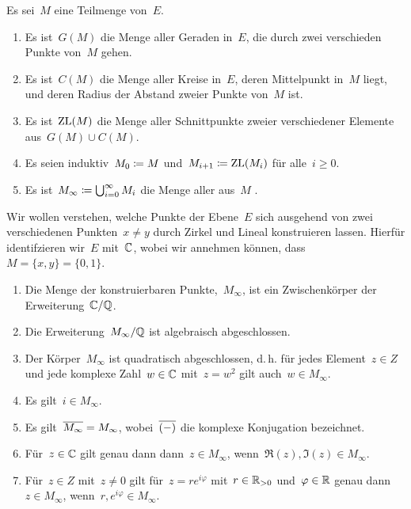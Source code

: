 \begin{definition}
  Es sei~$M$ eine Teilmenge von~$E$.
  \begin{enumerate}
    \item
      Es ist~$G(M)$ die Menge aller Geraden in~$E$, die durch zwei verschieden Punkte von~$M$ gehen.
    \item
      Es ist~$C(M)$ die Menge aller Kreise in~$E$, deren Mittelpunkt in~$M$ liegt, und deren Radius der Abstand zweier Punkte von~$M$ ist.
    \item
      Es ist~$\operatorname{ZL}(M)$ die Menge aller Schnittpunkte zweier verschiedener Elemente aus~$G(M) \cup C(M)$.
    \item
      Es seien induktiv~$M_0 \coloneqq M$ und~$M_{i+1} \coloneqq \operatorname{ZL}(M_i)$ für alle~$i \geq 0$.
    \item
      Es ist~$M_{\infty} \coloneqq \bigcup_{i=0}^\infty M_i$ die Menge aller aus~$M$ .
  \end{enumerate}
\end{definition}

Wir wollen verstehen, welche Punkte der Ebene~$E$ sich ausgehend von zwei verschiedenen Punkten~$x \neq y$ durch Zirkel und Lineal konstruieren lassen.
Hierfür identifzieren wir~$E$ mit~$\mathbb{C}$, wobei wir annehmen können, dass~$M = \{ x, y \} = \{ 0, 1 \}$.

\begin{theorem}
  \leavevmode
  \begin{enumerate}
    \item
      Die Menge der konstruierbaren Punkte,~$M_{\infty}$, ist ein Zwischenkörper der Erweiterung~$\mathbb{C} / \mathbb{Q}$.
    \item
      Die Erweiterung~$M_{\infty} / \mathbb{Q}$ ist algebraisch abgeschlossen.
    \item
      Der Körper~$M_{\infty}$ ist quadratisch abgeschlossen, d.\,h. für jedes Element~$z \in Z$ und jede komplexe Zahl~$w \in \mathbb{C}$ mit~$z = w^2$ gilt auch~$w \in M_{\infty}$.
    \item
      Es gilt~$i \in M_{\infty}$.
    \item
      Es gilt~$\overline{M_{\infty}} = M_{\infty}$, wobei~$\overline{(-)}$ die komplexe Konjugation bezeichnet.
    \item
      Für~$z \in \mathbb{C}$ gilt genau dann dann~$z \in M_{\infty}$, wenn~$\Re(z), \Im(z) \in M_{\infty}$.
    \item
      Für~$z \in Z$ mit~$z \neq 0$ gilt für~$z = r e^{i \varphi}$ mit~$r \in \mathbb{R}_{>0}$ und~$\varphi \in \mathbb{R}$ genau dann~$z \in M_{\infty}$, wenn~$r, e^{i \varphi} \in M_{\infty}$.
  \end{enumerate}
\end{theorem}


